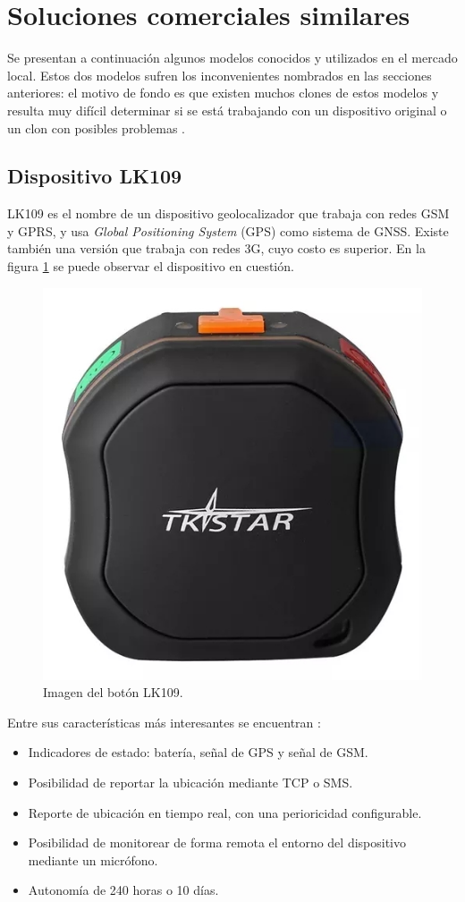 \section{Soluciones comerciales similares}

Se presentan a continuación algunos modelos conocidos y utilizados en el mercado local. Estos dos modelos sufren los inconvenientes nombrados en las secciones anteriores: el motivo de fondo es que existen muchos clones de estos modelos y resulta muy difícil determinar si se está trabajando con un dispositivo original o un clon con posibles problemas \citep{CLONES:1}.
\subsection{Dispositivo LK109}

LK109 es el nombre de un dispositivo geolocalizador que trabaja con redes GSM y GPRS, y usa \textit{Global Positioning System} (GPS) como sistema de GNSS. Existe también una versión que trabaja con redes 3G, cuyo costo es superior. En la figura \ref{fig:botonlk109} se puede observar el dispositivo en cuestión.

\begin{figure}[H]
	\centering
	\includegraphics[width=.6\textwidth]{./Figures/lk109.jpg}
	\caption{Imagen del botón LK109.}
	\label{fig:botonlk109}
\end{figure}

\pagebreak

Entre sus características más interesantes se encuentran \citep{LK109MANUAL:1}:
\begin{itemize}
\item Indicadores de estado: batería, señal de GPS y señal de GSM.
\item Posibilidad de reportar la ubicación mediante TCP o SMS.
\item Reporte de ubicación en tiempo real, con una perioricidad configurable.
\item Posibilidad de monitorear de forma remota el entorno del dispositivo mediante un micrófono.
\item Autonomía de 240 horas o 10 días.
\end{itemize}



